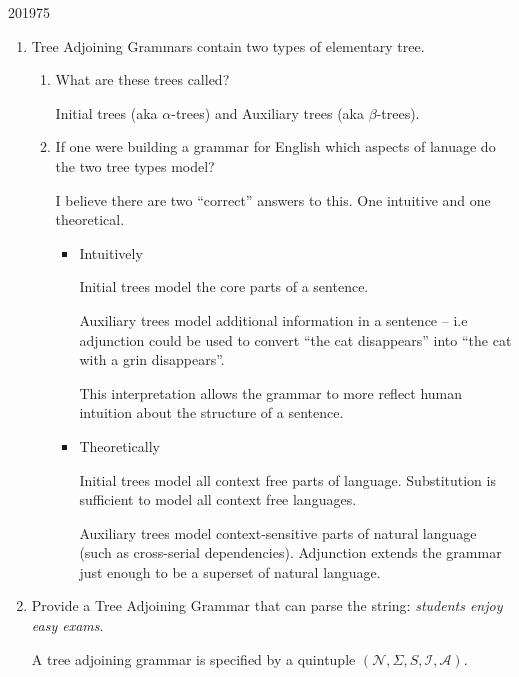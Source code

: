 \documentclass[10pt,\jkfside,a4paper]{article}
\begin{document}
\begin{examquestion}{2019}{7}{5}

\begin{enumerate}[label=(\alph*)]

\item Tree Adjoining Grammars contain two types of elementary tree.

\begin{enumerate}[label=(\roman*)]

\item What are these trees called?

Initial trees (aka $\alpha$-trees) and Auxiliary trees (aka $\beta$-trees).

\item If one were building a grammar for English which aspects of lanuage do
the two tree types model?

I believe there are two ``correct'' answers to this. One intuitive and one
theoretical.

\begin{itemize}

\item Intuitively

Initial trees model the core parts of a sentence.

Auxiliary trees model additional information in a sentence -- i.e adjunction
could be used to convert ``the cat disappears'' into
``the cat with a grin disappears''.

This interpretation allows the grammar to more reflect human intuition
about the structure of a sentence.

\item Theoretically

Initial trees model all context free parts of language. Substitution is
sufficient to model all context free languages.

Auxiliary trees model context-sensitive parts of natural language (such
as cross-serial dependencies). Adjunction extends the grammar just enough to
be a superset of natural language.

\end{itemize}

\end{enumerate}

\item Provide a Tree Adjoining Grammar that can parse the string:
\textit{students enjoy easy exams}.

A tree adjoining grammar is specified by a quintuple $(\mathcal N, \Sigma,
S, \mathcal I, \mathcal A)$.


\end{enumerate}
\end{examquestion}
\end{document}
